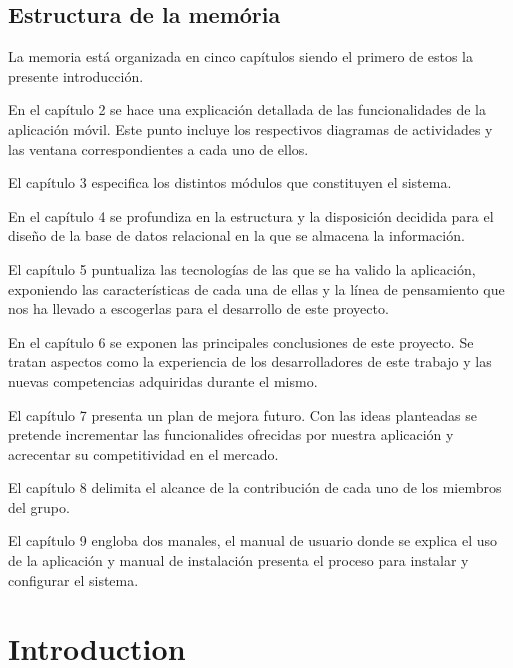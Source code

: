 \documentclass[11pt,spanish,
		listoftables,listoffigures]
		{tfgplantilla}
\begin{document}
\section{Estructura de la mem\'oria}

La memoria está organizada en cinco capítulos siendo el primero de estos la presente introducción.

En el capítulo 2 se hace una explicación detallada de las funcionalidades de la aplicación móvil. Este punto incluye los respectivos diagramas de actividades y las ventana correspondientes a cada uno de ellos.

El capítulo 3 especifica los distintos módulos que constituyen el sistema. 

En el capítulo 4 se profundiza en la estructura y la disposición decidida para el diseño de la base de datos relacional en la que se almacena la información.

El capítulo 5 puntualiza las tecnologías de las que se ha valido la aplicación, exponiendo las características de cada una de ellas y la línea de pensamiento que nos ha llevado a escogerlas para el desarrollo de este proyecto.

En el capítulo 6 se exponen las principales conclusiones de este proyecto. Se tratan aspectos como la experiencia de los desarrolladores de este trabajo y las nuevas competencias adquiridas durante el mismo.

El capítulo 7 presenta un plan de mejora futuro. Con las ideas planteadas se pretende incrementar las funcionalides ofrecidas por nuestra aplicación y acrecentar su competitividad en el mercado.

El capítulo 8 delimita el alcance de la contribución de cada uno de los miembros del grupo.

El capítulo 9 engloba dos manales, el manual de usuario donde se explica el uso de la aplicación y manual de instalación presenta el proceso para instalar y configurar el sistema.

\addtocounter{chapter}{-1}
\chapter{Introduction}
\end{document}
